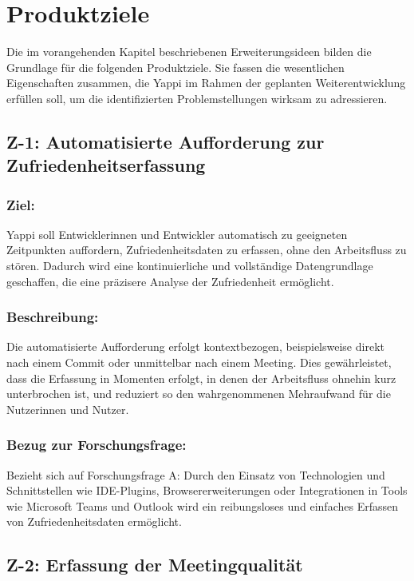 \documentclass[12pt,a4paper]{report}
\begin{document}
\section{Produktziele}\label{produktziele}

Die im vorangehenden Kapitel beschriebenen Erweiterungsideen bilden die Grundlage für die folgenden Produktziele. Sie fassen die
wesentlichen Eigenschaften zusammen, die Yappi im Rahmen der geplanten Weiterentwicklung erfüllen soll, um die identifizierten
Problemstellungen wirksam zu adressieren.

\subsection{Z-1: Automatisierte Aufforderung zur Zufriedenheitserfassung}

\subsubsection{Ziel:}

Yappi soll Entwicklerinnen und Entwickler automatisch zu geeigneten Zeitpunkten auffordern, Zufriedenheitsdaten zu erfassen, ohne
den Arbeitsfluss zu stören. Dadurch wird eine kontinuierliche und vollständige Datengrundlage geschaffen, die eine präzisere
Analyse der Zufriedenheit ermöglicht.

\subsubsection{Beschreibung:}

Die automatisierte Aufforderung erfolgt kontextbezogen, beispielsweise direkt nach einem Commit oder unmittelbar nach einem
Meeting. Dies gewährleistet, dass die Erfassung in Momenten erfolgt, in denen der Arbeitsfluss ohnehin kurz unterbrochen ist, und
reduziert so den wahrgenommenen Mehraufwand für die Nutzerinnen und Nutzer.

\subsubsection{Bezug zur Forschungsfrage:}

Bezieht sich auf Forschungsfrage A: Durch den Einsatz von Technologien und Schnittstellen wie IDE-Plugins, Browsererweiterungen
oder Integrationen in Tools wie Microsoft Teams und Outlook wird ein reibungsloses und einfaches Erfassen von Zufriedenheitsdaten
ermöglicht.

\subsection{Z-2: Erfassung der Meetingqualität}
\end{document}
